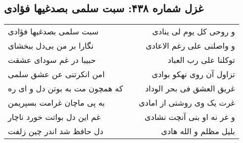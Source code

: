 \begin{center}
\section*{غزل شماره ۴۳۸: سبت سلمی بصدغیها فؤادی}
\label{sec:sh438}
\begin{longtable}{l p{0.5cm} r}
سبت سلمی بصدغیها فؤادی
&&
و روحی کل یوم لی ینادی
\\
نگارا بر من بی‌دل ببخشای
&&
و واصلنی علی رغم الاعادی
\\
حبیبا در غم سودای عشقت
&&
توکلنا علی رب العباد
\\
امن انکرتنی عن عشق سلمی
&&
تزاول آن روی نهکو بوادی
\\
که همچون مت به بوتن دل و ای ره
&&
غریق العشق فی بحر الوداد
\\
به پی ماچان غرامت بسپریمن
&&
غرت یک وی روشتی از امادی
\\
غم این دل بواتت خورد ناچار
&&
و غر نه او بنی آنچت نشادی
\\
دل حافظ شد اندر چین زلفت
&&
بلیل مظلم و الله هادی
\\
\end{longtable}
\end{center}

